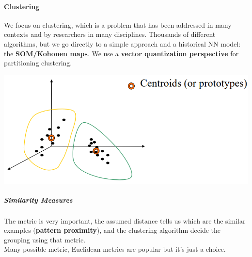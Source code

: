 \documentclass[10pt]{report}
\begin{document}
\paragraph{Clustering} We focus on clustering, which is a problem that has been addressed in many contexts and by researchers in many disciplines. Thousands of different algorithms, but we go directly to a simple approach and a historical NN model: the \textbf{SOM/Kohonen maps}. We use a \textbf{vector quantization perspective} for partitioning clustering.
\begin{center}
	\includegraphics[scale=0.5]{31.png}
\end{center}
\subparagraph{Similarity Measures} The metric is very important, the assumed distance tells us which are the similar examples (\textbf{pattern proximity}), and the clustering algorithm decide the grouping using that metric.\\
Many possible metric, Euclidean metrics are popular but it's just a choice.
\end{document}
